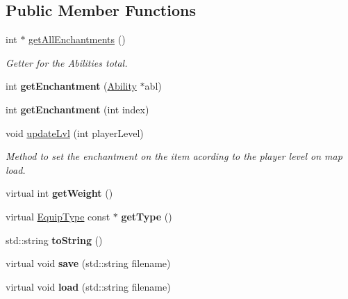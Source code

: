 \subsection*{Public Member Functions}
\begin{DoxyCompactItemize}
\item 
int $\ast$ \hyperlink{class_equipment_a9e2505f187dadc04a811a9d0680d29cf}{get\+All\+Enchantments} ()
\begin{DoxyCompactList}\small\item\em Getter for the Abilities total. \end{DoxyCompactList}\item 
\hypertarget{class_equipment_a562d37bd3587b738c13c262650cf8489}{}\label{class_equipment_a562d37bd3587b738c13c262650cf8489} 
int {\bfseries get\+Enchantment} (\hyperlink{class_ability}{Ability} $\ast$abl)
\item 
\hypertarget{class_equipment_a476657aab86ed7d26a97aa77454f7ac3}{}\label{class_equipment_a476657aab86ed7d26a97aa77454f7ac3} 
int {\bfseries get\+Enchantment} (int index)
\item 
void \hyperlink{class_equipment_ab56d6a16b2151d7793c4b5fddde1f145}{update\+Lvl} (int player\+Level)
\begin{DoxyCompactList}\small\item\em Method to set the enchantment on the item acording to the player level on map load. \end{DoxyCompactList}\item 
\hypertarget{class_equipment_a3d293fd3861ebddc0a4ae1e26d54ff36}{}\label{class_equipment_a3d293fd3861ebddc0a4ae1e26d54ff36} 
virtual int {\bfseries get\+Weight} ()
\item 
\hypertarget{class_equipment_a274e31858324c1774dd022315ee056a9}{}\label{class_equipment_a274e31858324c1774dd022315ee056a9} 
virtual \hyperlink{class_equip_type}{Equip\+Type} const  $\ast$ {\bfseries get\+Type} ()
\item 
\hypertarget{class_equipment_a66ae3c2ca283f3788abbd61b45ee5077}{}\label{class_equipment_a66ae3c2ca283f3788abbd61b45ee5077} 
std\+::string {\bfseries to\+String} ()
\item 
\hypertarget{class_equipment_ac534ea06d524c524201e359f54938146}{}\label{class_equipment_ac534ea06d524c524201e359f54938146} 
virtual void {\bfseries save} (std\+::string filename)
\item 
\hypertarget{class_equipment_ac07ac998f85529e90bd209b32c89809d}{}\label{class_equipment_ac07ac998f85529e90bd209b32c89809d} 
virtual void {\bfseries load} (std\+::string filename)
\end{DoxyCompactItemize}
